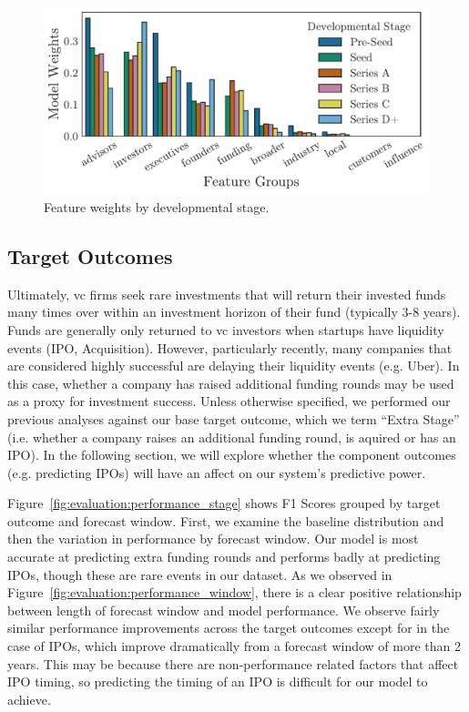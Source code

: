 \documentclass[../thesis/thesis.tex]{subfiles}
\begin{document}
\begin{figure}[!htb]
    \centering
    \includegraphics[width=\textwidth]{../figures/evaluation/features_stage}
    \caption[Feature weights by developmental stage]{Feature weights by developmental stage.}
    \label{fig:evaluation:features_stage}
\end{figure}

\subsection{Target Outcomes}

Ultimately, \gls{vc} firms seek rare investments that will return their invested funds many times over within an investment horizon of their fund (typically 3-8 years). Funds are generally only returned to \gls{vc} investors when startups have liquidity events (IPO, Acquisition). However, particularly recently, many companies that are considered highly successful are delaying their liquidity events (e.g. Uber). In this case, whether a company has raised additional funding rounds may be used as a proxy for investment success. Unless otherwise specified, we performed our previous analyses against our base target outcome, which we term ``Extra Stage'' (i.e. whether a company raises an additional funding round, is aquired or has an IPO). In the following section, we will explore whether the component outcomes (e.g. predicting IPOs) will have an affect on our system's predictive power.

Figure~\ref{fig:evaluation:performance_stage} shows F1 Scores grouped by target outcome and forecast window. First, we examine the baseline distribution and then the variation in performance by forecast window. Our model is most accurate at predicting extra funding rounds and performs badly at predicting IPOs, though these are rare events in our dataset. As we observed in Figure~\ref{fig:evaluation:performance_window}, there is a clear positive relationship between length of forecast window and model performance. We observe fairly similar performance improvements across the target outcomes except for in the case of IPOs, which improve dramatically from a forecast window of more than 2 years. This may be because there are non-performance related factors that affect IPO timing, so predicting the timing of an IPO is difficult for our model to achieve.
\end{document}
